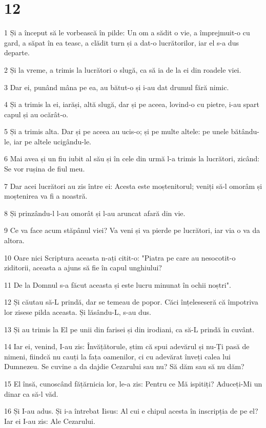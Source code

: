 \chapter{12}

\par 1 Și a început să le vorbească în pilde: Un om a sădit o vie, a împrejmuit-o cu gard, a săpat în ea teasc, a clădit turn și a dat-o lucrătorilor, iar el s-a dus departe.
\par 2 Și la vreme, a trimis la lucrători o slugă, ca să ia de la ei din roadele viei.
\par 3 Dar ei, punând mâna pe ea, au bătut-o și i-au dat drumul fără nimic.
\par 4 Și a trimis la ei, iarăși, altă slugă, dar și pe aceea, lovind-o cu pietre, i-au spart capul și au ocărât-o.
\par 5 Și a trimis alta. Dar și pe aceea au ucis-o; și pe multe altele: pe unele bătându-le, iar pe altele ucigându-le.
\par 6 Mai avea și un fiu iubit al său și în cele din urmă l-a trimis la lucrători, zicând: Se vor rușina de fiul meu.
\par 7 Dar acei lucrători au zis între ei: Acesta este moștenitorul; veniți să-l omorâm și moștenirea va fi a noastră.
\par 8 Și prinzându-l l-au omorât și l-au aruncat afară din vie.
\par 9 Ce va face acum stăpânul viei? Va veni și va pierde pe lucrători, iar via o va da altora.
\par 10 Oare nici Scriptura aceasta n-ați citit-o: "Piatra pe care au nesocotit-o ziditorii, aceasta a ajuns să fie în capul unghiului?
\par 11 De la Domnul s-a făcut aceasta și este lucru minunat în ochii noștri".
\par 12 Și căutau să-L prindă, dar se temeau de popor. Căci înțeleseseră că împotriva lor zisese pilda aceasta. Și lăsându-L, s-au dus.
\par 13 Și au trimis la El pe unii din farisei și din irodiani, ca să-L prindă în cuvânt.
\par 14 Iar ei, venind, I-au zis: Învățătorule, știm că spui adevărul și nu-Ți pasă de nimeni, fiindcă nu cauți la fața oamenilor, ci cu adevărat înveți calea lui Dumnezeu. Se cuvine a da dajdie Cezarului sau nu? Să dăm sau să nu dăm?
\par 15 El însă, cunoscând fățărnicia lor, le-a zis: Pentru ce Mă ispitiți? Aduceți-Mi un dinar ca să-l văd.
\par 16 Și I-au adus. Și i-a întrebat Iisus: Al cui e chipul acesta în inscripția de pe el? Iar ei I-au zis: Ale Cezarului.
